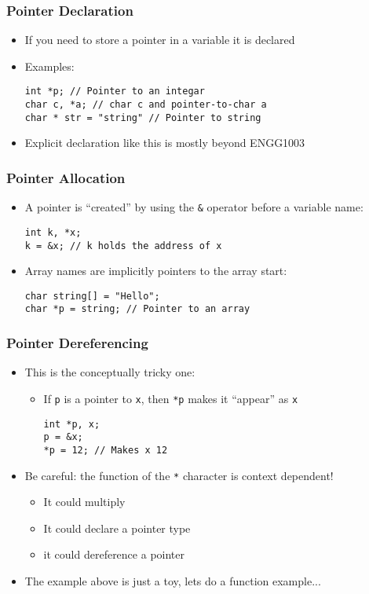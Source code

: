 \documentclass[14pt]{beamer}
\begin{document}
\begin{frame}[fragile]
\frametitle{Pointer Declaration}
\begin{itemize}
\item If you need to store a pointer in a variable it is declared
\item Examples:
\begin{lstlisting}[style=CStyle]
int *p; // Pointer to an integar
char c, *a; // char c and pointer-to-char a
char * str = "string" // Pointer to string
\end{lstlisting}
\item Explicit declaration like this is mostly beyond ENGG1003
\end{itemize}
\end{frame}

\begin{frame}[fragile]
\frametitle{Pointer Allocation}
\begin{itemize}
\item A pointer is ``created'' by using the \texttt{\&} operator before a variable name:
\begin{lstlisting}[style=CStyle]
int k, *x;
k = &x; // k holds the address of x
\end{lstlisting}
\item Array names are implicitly pointers to the array start:
\begin{lstlisting}[style=CStyle]
char string[] = "Hello";
char *p = string; // Pointer to an array
\end{lstlisting}
\end{itemize}
\end{frame}

\begin{frame}[fragile]
\frametitle{Pointer Dereferencing}
\begin{itemize}
\item This is the conceptually tricky one:
	\begin{itemize}
		\item If \texttt{p} is a pointer to \texttt{x}, then \texttt{*p} makes it ``appear'' as \texttt{x}
		\begin{lstlisting}[style=CStyle]
int *p, x;
p = &x;
*p = 12; // Makes x 12
\end{lstlisting}
	\end{itemize}
\item Be careful: the function of the \texttt{*} character is context dependent!
	\begin{itemize}
		\item It could multiply
		\item It could declare a pointer type
		\item it could dereference a pointer
	\end{itemize}
\pause
\item The example above is just a toy, lets do a function example...
\end{itemize}
\end{frame}
\end{document}
